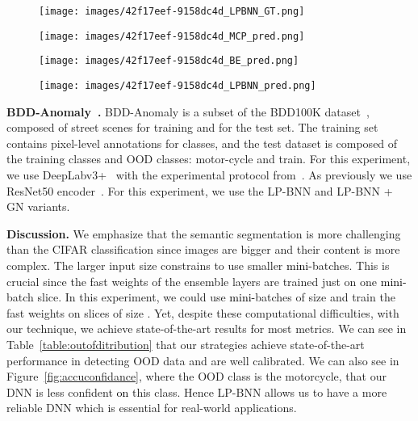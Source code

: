 \documentclass[10pt,twocolumn,letterpaper]{article}
\newcommand{\ab}[1]{\textcolor{black}{#1}}
\begin{document}
\begin{figure*}[t!]
        \begin{subfigure}[b]{0.16\linewidth}
\texttt{[image: images/42f17eef-9158dc4d\_LPBNN\_GT.png]}
\end{subfigure}\;
        \begin{subfigure}[b]{0.16\linewidth}
\texttt{[image: images/42f17eef-9158dc4d\_MCP\_pred.png]}
\end{subfigure}\;
        \begin{subfigure}[b]{0.16\linewidth}
\texttt{[image: images/42f17eef-9158dc4d\_BE\_pred.png]}
\end{subfigure}\;
         \begin{subfigure}[b]{0.16\linewidth}
\texttt{[image: images/42f17eef-9158dc4d\_LPBNN\_pred.png]}
\end{subfigure}\;
 \caption{
\ab{\textbf{Visual assessment on two BDD-Anomaly test images containing a motorcycle (OOD class).} For each image: \emph{on the first row}, input image and confidence maps from MCP~\cite{hendrycks2016baseline}, BE~\cite{wen2020batchensemble}, and LP-BNN; \emph{on the second row}, ground-truth segmentation and segmentation maps from MCP, BE, and LP-BNN. LP-BNN is less confident on the OOD objects.}
 }
  \label{fig:accuconfidance}
\vspace{-5mm}
\end{figure*}

       
     



   




\noindent\textbf{BDD-Anomaly~\cite{hendrycks2019anomalyseg}.}
BDD-Anomaly is a subset of the BDD100K dataset~\cite{yu2020bdd100k}, composed of  street scenes for training and  for the test set. The training set contains pixel-level annotations for  classes, and the test dataset is composed of the  training classes and  OOD classes: motor-cycle and train.
For this experiment, we use DeepLabv3+~\cite{chen2018encoder} with the experimental protocol from~\cite{hendrycks2019anomalyseg}. As previously we use ResNet50 encoder~\cite{he2016deep}. For this experiment, we use  the LP-BNN and LP-BNN + GN variants.

\noindent\textbf{Discussion.} 
We emphasize that the semantic segmentation is more challenging than the CIFAR classification since {images are bigger} and their content is more complex. The larger input size constrains to use smaller \ab{mini-}batches.  This is crucial since the fast weights of the ensemble layers are trained just on one \ab{mini-}batch slice. In this experiment, we could use \ab{mini-}batches of size  and train the fast weights on slices of size . Yet, despite these computational difficulties, with our technique, we achieve state-of-the-art results for most metrics. We can see in Table~\ref{table:outofditribution} that our strategies {achieve} state-of-the-art performance in detecting OOD data and are well calibrated. We can also see in Figure~\ref{fig:accuconfidance}, where the OOD class is the motorcycle, that our DNN is less confident 
\ab{on} this class. Hence LP-BNN allows us to have a more reliable DNN which is essential for real-world applications.
\end{document}
